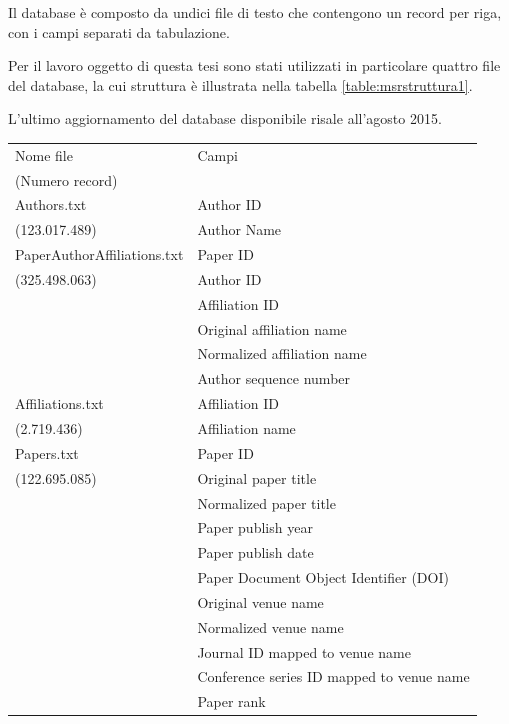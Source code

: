 \documentclass[12pt,a4paper,twoside]{report}
\begin{document}
Il database è composto da undici file di testo che contengono un record per riga, con i campi
separati da tabulazione.

Per il lavoro oggetto di questa tesi sono stati utilizzati in particolare quattro file del database,
la cui struttura è illustrata nella tabella \ref{table:msrstruttura1}.

L'ultimo aggiornamento del database disponibile risale all'agosto 2015.
\begin{center}
\label{table:msrstruttura1}
\begin{longtable}{| l | l |}
\hline
Nome file&
Campi\\
(Numero record)&\\
\hline
Authors.txt&Author ID\\
(123.017.489)&Author Name\\
\hline
PaperAuthorAffiliations.txt&Paper ID\\
(325.498.063)&Author ID\\
&Affiliation ID\\
&Original affiliation name\\
&Normalized affiliation name\\
&Author sequence number\\
\hline
Affiliations.txt&Affiliation ID\\
(2.719.436)&Affiliation name\\
\hline
Papers.txt&Paper ID\\
(122.695.085)&Original paper title\\
&Normalized paper title\\
&Paper publish year\\
&Paper publish date\\
&Paper Document Object Identifier (DOI)\\
&Original venue name\\
&Normalized venue name\\
&Journal ID mapped to venue name\\
&Conference series ID mapped to venue name\\
&Paper rank\\
\hline
\end{longtable}
\end{center}
\FloatBarrier
\end{document}
